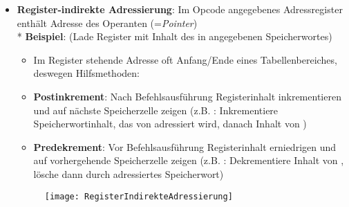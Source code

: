 \begin{itemize}
	\item \textbf{Register-indirekte Adressierung}: Im Opcode angegebenes Adressregister enthält Adresse des Operanten (=\emph{Pointer}) \\* \textbf{Beispiel}:  (Lade Register  mit Inhalt des in  angegebenen Speicherwortes)
	\begin{itemize}
		\item Im Register stehende Adresse oft Anfang/Ende eines Tabellenbereiches, deswegen Hilfsmethoden:
		\item \textbf{Postinkrement}: Nach Befehlsausführung Registerinhalt inkrementieren und auf nächste Speicherzelle zeigen (z.B. : Inkrementiere Speicherwortinhalt, das von  adressiert wird, danach Inhalt von )
		\item \textbf{Predekrement}: Vor Befehlsausführung Registerinhalt erniedrigen und auf vorhergehende Speicherzelle zeigen (z.B. : Dekrementiere Inhalt von , lösche dann durch  adressiertes Speicherwort)
	\end{itemize}
		\begin{figure}[ht]
		  \centering
		  \texttt{[image: RegisterIndirekteAdressierung]}
		  \label{RegisterIndirekteAdressierung}
		\end{figure}


\end{itemize}
